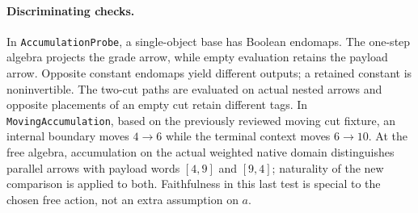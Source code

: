 \paragraph{Discriminating checks.} In \texttt{AccumulationProbe}, a
single-object base has Boolean endomaps. The one-step algebra projects
the grade arrow, while empty evaluation retains the payload arrow.
Opposite constant endomaps yield different outputs; a retained constant
is noninvertible. The two-cut paths are evaluated on actual nested
arrows and opposite placements of an empty cut retain different tags.
In \texttt{MovingAccumulation}, based on the previously reviewed
moving cut fixture, an internal boundary moves $4\to6$ while the
terminal context moves $6\to10$. At the free algebra, accumulation on
the actual weighted native domain distinguishes parallel arrows with
payload words $[4,9]$ and $[9,4]$; naturality of the new comparison
is applied to both. Faithfulness in this last test is special to
the chosen free action, not an extra assumption on $a$.
